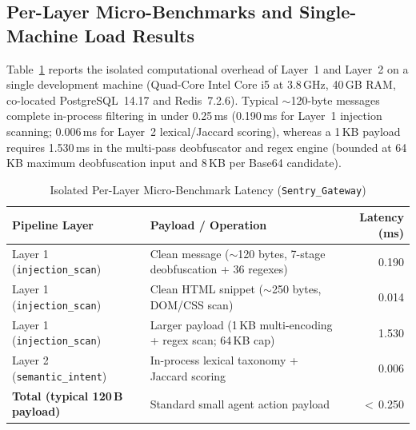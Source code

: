 \documentclass[11pt, a4paper]{article}
\begin{document}
\subsection{Per-Layer Micro-Benchmarks and Single-Machine Load Results}
\label{subsec:benchmarks}

Table~\ref{tab:microbench} reports the isolated computational overhead of Layer~1 and Layer~2 on a single development machine (Quad-Core Intel Core i5 at 3.8\,GHz, 40\,GB RAM, co-located PostgreSQL~14.17 and Redis~7.2.6). Typical $\sim$120-byte messages complete in-process filtering in under 0.25\,ms (0.190\,ms for Layer~1 injection scanning; 0.006\,ms for Layer~2 lexical/Jaccard scoring), whereas a 1\,KB payload requires 1.530\,ms in the multi-pass deobfuscator and regex engine (bounded at 64\,KB maximum deobfuscation input and 8\,KB per Base64 candidate).

\begin{table}[htbp]
\centering
\caption{Isolated Per-Layer Micro-Benchmark Latency (\texttt{Sentry\_Gateway})}
\label{tab:microbench}
\begin{tabular}{@{} l l r @{}}
\toprule
\textbf{Pipeline Layer} & \textbf{Payload / Operation} & \textbf{Latency (ms)} \\
\midrule
Layer 1 (\texttt{injection\_scan}) & Clean message ($\sim$120 bytes, 7-stage deobfuscation + 36 regexes) & 0.190 \\
Layer 1 (\texttt{injection\_scan}) & Clean HTML snippet ($\sim$250 bytes, DOM/CSS scan)                  & 0.014 \\
Layer 1 (\texttt{injection\_scan}) & Larger payload (1\,KB multi-encoding + regex scan; 64\,KB cap)       & 1.530 \\
Layer 2 (\texttt{semantic\_intent}) & In-process lexical taxonomy + Jaccard scoring                      & 0.006 \\
\midrule
\textbf{Total (typical 120\,B payload)} & Standard small agent action payload                            & $<$\,0.250 \\
\bottomrule
\end{tabular}
\end{table}
\end{document}
